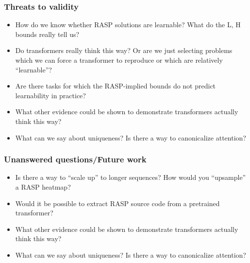 \documentclass[mathserif,notheorems]{beamer}
\theoremstyle{plain} %
\theoremstyle{definition} %
\begin{document}

  \begin{frame}
    \frametitle{Threats to validity}
    \begin{itemize}
      \item How do we know whether RASP solutions are learnable? What do the L, H bounds really tell us?
      \item Do transformers really think this way? Or are we just selecting problems which we can force a transformer to reproduce or which are relatively ``learnable''?
      \item Are there tasks for which the RASP-implied bounds do not predict learnability in practice?
      \item What other evidence could be shown to demonstrate transformers actually think this way?
      \item What can we say about uniqueness? Is there a way to canonicalize attention?
    \end{itemize}
  \end{frame}

  \begin{frame}
    \frametitle{Unanswered questions/Future work}
    \begin{itemize}
      \item Is there a way to ``scale up'' to longer sequences? How would you ``upsample'' a RASP heatmap?
      \item Would it be possible to extract RASP source code from a pretrained transformer?
      \item What other evidence could be shown to demonstrate transformers actually think this way?
      \item What can we say about uniqueness? Is there a way to canonicalize attention?
    \end{itemize}
  \end{frame}
\end{document}
